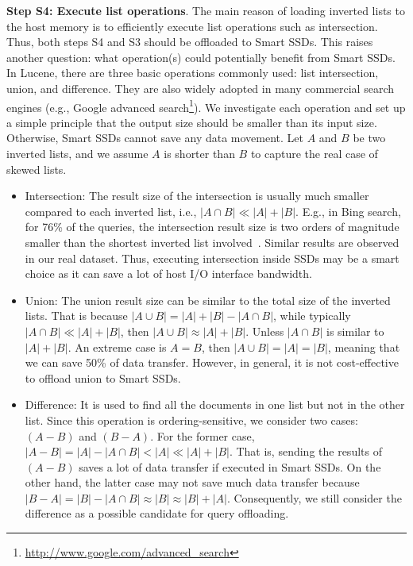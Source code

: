 \textbf{Step S4: Execute list operations}. The main reason of loading inverted lists to the host memory is to efficiently execute list operations such as intersection. Thus, both steps S4 and S3 should be offloaded to Smart SSDs. This raises another question: what operation(s) could potentially benefit from Smart SSDs. In Lucene, there are three basic operations commonly used: list \textsf{intersection}, \textsf{union}, and \textsf{difference}. They are also widely adopted in many commercial search engines (e.g., Google advanced search\footnote{\small\url{http://www.google.com/advanced_search}}). We investigate each operation and set up a simple principle that the output size should be smaller than its input size. Otherwise, Smart SSDs cannot save any data movement. Let $A$ and $B$ be two inverted lists, and we assume $A$ is shorter than $B$ to capture the real case of skewed lists.
\begin{itemize}%
  \item \textsf{Intersection}: The result size of the intersection is usually much smaller compared to each inverted list, i.e., $|A\cap B| \ll |A| + |B|$. E.g., in Bing search, for 76\% of the queries, the intersection result size is two orders of magnitude smaller than the shortest inverted list involved~\cite{Ding2011}. Similar results are observed in our real dataset. Thus, executing intersection inside SSDs may be a smart choice as it can save a lot of host I/O interface bandwidth.

  \item \textsf{Union}: The union result size can be similar to the total size of the inverted lists. That is because $|A\cup B| = |A| + |B| - |A\cap B|$, while typically $|A\cap B| \ll |A| + |B|$, then $|A\cup B| \approx |A| + |B|$. Unless $|A\cap B|$ is similar to $|A| + |B|$. An extreme case is $A = B$, then $|A\cup B| = |A| = |B|$, meaning that we can save 50\% of data transfer. However, in general, it is not cost-effective to offload \textsf{union} to Smart SSDs.

  \item \textsf{Difference}: It is used to find all the documents in one list but not in the other list. Since this operation is ordering-sensitive, we consider two cases: $(A - B)$ and $(B - A)$. For the former case, $|A - B| = |A| - |A\cap B| < |A| \ll |A| + |B|$. That is, sending the results of $(A - B)$ saves a lot of data transfer if executed in Smart SSDs. On the other hand, the latter case may not save much data transfer because $|B - A| = |B| - |A\cap B| \approx |B| \approx |B| + |A|$. Consequently, we still consider the \textsf{difference} as a possible candidate for query offloading.
\end{itemize}

